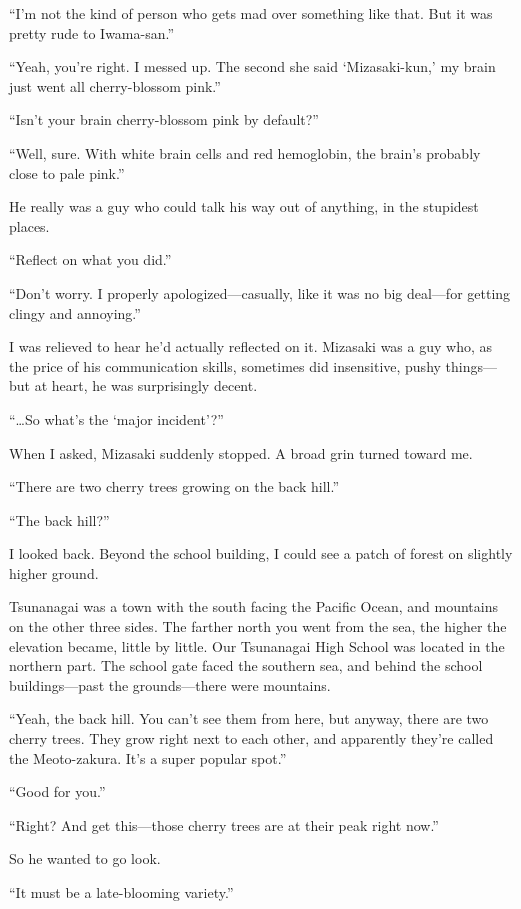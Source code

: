 \documentclass[
    a4paper,
    12pt,
    twoside,
    openany,
    UTF8,
    fontset=windows
]{ctexbook}
\begin{document}
``I'm not the kind of person who gets mad over something like that. But it was pretty rude to Iwama-san.''

``Yeah, you're right. I messed up. The second she said `Mizasaki-kun,' my brain just went all cherry-blossom pink.''

``Isn't your brain cherry-blossom pink by default?''

``Well, sure. With white brain cells and red hemoglobin, the brain's probably close to pale pink.''

He really was a guy who could talk his way out of anything, in the stupidest places.

``Reflect on what you did.''

``Don't worry. I properly apologized---casually, like it was no big deal---for getting clingy and annoying.''

I was relieved to hear he'd actually reflected on it. Mizasaki was a guy who, as the price of his communication skills, sometimes did insensitive, pushy things---but at heart, he was surprisingly decent.

``\dots So what's the `major incident'?''

When I asked, Mizasaki suddenly stopped. A broad grin turned toward me.

``There are two cherry trees growing on the back hill.''

``The back hill?''

I looked back. Beyond the school building, I could see a patch of forest on slightly higher ground.

Tsunanagai was a town with the south facing the Pacific Ocean, and mountains on the other three sides. The farther north you went from the sea, the higher the elevation became, little by little. Our Tsunanagai High School was located in the northern part. The school gate faced the southern sea, and behind the school buildings---past the grounds---there were mountains.

``Yeah, the back hill. You can't see them from here, but anyway, there are two cherry trees. They grow right next to each other, and apparently they're called the Meoto-zakura. It's a super popular spot.''

``Good for you.''

``Right? And get this---those cherry trees are at their peak right now.''

So he wanted to go look.

``It must be a late-blooming variety.''
\end{document}
